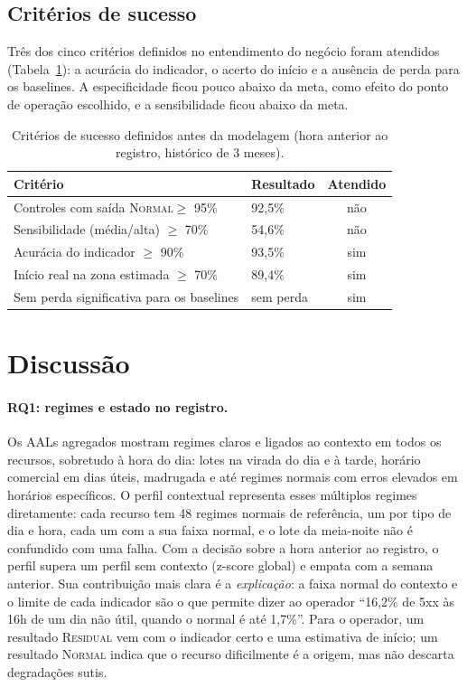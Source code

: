\documentclass[sigconf,nonacm]{acmart}
\newcommand{\Normal}{\textsc{Normal}\xspace}
\newcommand{\Residual}{\textsc{Residual}\xspace}
\begin{document}
\subsection{Critérios de sucesso}
Três dos cinco critérios definidos no entendimento do negócio foram atendidos (Tabela~\ref{tab:criterios}): a acurácia do indicador, o acerto do início e a ausência de perda para os baselines. A especificidade ficou pouco abaixo da meta, como efeito do ponto de operação escolhido, e a sensibilidade ficou abaixo da meta.

\begin{table}[t]
  \caption{Critérios de sucesso definidos antes da modelagem (hora anterior ao registro, histórico de 3 meses).}
  \label{tab:criterios}
  \small
  \begin{tabular}{p{}p{}c}
    \toprule
    Critério & Resultado & Atendido \\
    \midrule
    Controles com saída \Normal $\geq$ 95\% & 92,5\% & não \\
    Sensibilidade (média/alta) $\geq$ 70\% & 54,6\% & não \\
    Acurácia do indicador $\geq$ 90\% & 93,5\% & sim \\
    Início real na zona estimada $\geq$ 70\% & 89,4\% & sim \\
    Sem perda significativa para os baselines & sem perda & sim \\
    \bottomrule
  \end{tabular}
\end{table}

\section{Discussão}\label{sec:discussao}

\paragraph{RQ1: regimes e estado no registro.} Os AALs agregados mostram regimes claros e ligados ao contexto em todos os recursos, sobretudo à hora do dia: lotes na virada do dia e à tarde, horário comercial em dias úteis, madrugada e até regimes normais com erros elevados em horários específicos. O perfil contextual representa esses múltiplos regimes diretamente: cada recurso tem 48 regimes normais de referência, um por tipo de dia e hora, cada um com a sua faixa normal, e o lote da meia-noite não é confundido com uma falha. Com a decisão sobre a hora anterior ao registro, o perfil supera um perfil sem contexto (z-score global) e empata com a semana anterior. Sua contribuição mais clara é a \emph{explicação}: a faixa normal do contexto e o limite de cada indicador são o que permite dizer ao operador ``16,2\% de 5xx às 16h de um dia não útil, quando o normal é até 1,7\%''. Para o operador, um resultado \Residual vem com o indicador certo e uma estimativa de início; um resultado \Normal indica que o recurso dificilmente é a origem, mas não descarta degradações sutis.
\end{document}
